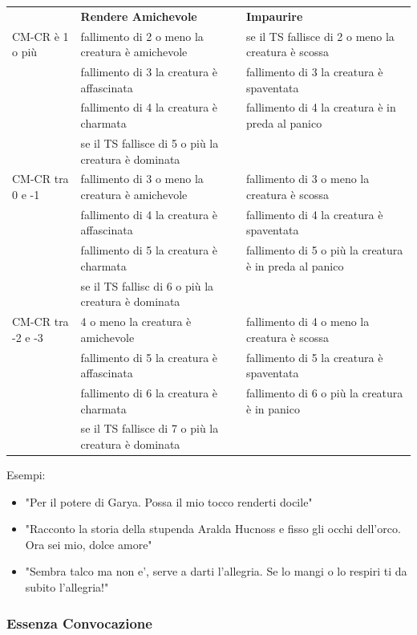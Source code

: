 \documentclass[a4paper,10 pt,twoside,openany]{book}
\begin{document}
\begin{tabular}{L{2.5cm} L{7cm} L{7cm}}
	\toprule
	& \textbf{Rendere Amichevole}         & \textbf{Impaurire}\\
	CM-CR è 1 o più   & fallimento di 2 o meno la creatura è amichevole     & se il TS fallisce di 2 o meno la creatura è scossa\\
	& fallimento di 3 la creatura è affascinata     & fallimento di 3 la creatura è spaventata\\
	& fallimento di 4 la creatura è charmata        & fallimento di 4 la creatura è in preda al panico\\
	& se il TS fallisce di 5 o più la creatura è dominata         & \\
	CM-CR tra 0 e -1  & fallimento di 3 o meno la creatura è amichevole   & fallimento di 3 o meno la creatura è scossa\\
	& fallimento di 4 la creatura è affascinata  & fallimento di 4 la creatura è spaventata\\
	& fallimento di 5 la creatura è charmata     & fallimento di 5 o più la creatura è in preda al panico\\
	& se il TS fallisc di 6 o più la creatura è dominata          & \\
	CM-CR tra -2 e -3 & 4 o meno la creatura è amichevole  & fallimento di 4 o meno la creatura è scossa\\
	& fallimento di 5 la creatura è affascinata      & fallimento di 5 la creatura è spaventata\\
	& fallimento di 6 la creatura è charmata         & fallimento di 6 o più la creatura è in panico\\
	& se il TS fallisce di 7 o più la creatura è dominata & \\
\end{tabular}


\bigskip

Esempi:
\begin{itemize}
	\item
	"Per il potere di Garya. Possa il mio tocco renderti docile"
	\item
	"Racconto la storia della stupenda Aralda Hucnoss e fisso gli occhi dell'orco. Ora sei mio, dolce amore"
	\item
	"Sembra talco ma non e', serve a darti l'allegria. Se lo mangi o lo respiri ti da subito l'allegria!"
\end{itemize}

\pagebreak

\subsubsection{Essenza Convocazione}
\end{document}
